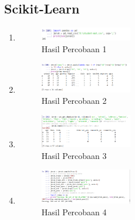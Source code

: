 	\subsection{Scikit-Learn}
	\begin{enumerate}
		\item \hfill \break 
		\begin{figure}[H]
			\includegraphics[width=4cm]{figures/1174043/chapter2/hasil1.png}
			\centering
			\caption{Hasil Percobaan 1}
		\end{figure}
		
		\item \hfill \break 
		\begin{figure}[H]
			\includegraphics[width=4cm]{figures/1174043/chapter2/hasil2.png}
			\centering
			\caption{Hasil Percobaan 2}
		\end{figure}
		
		\item \hfill \break 
		\begin{figure}[H]
			\includegraphics[width=4cm]{figures/1174043/chapter2/hasil3.png}
			\centering
			\caption{Hasil Percobaan 3}
		\end{figure}
		
		\item \hfill \break 
		\begin{figure}[H]
			\includegraphics[width=4cm]{figures/1174043/chapter2/hasil4.png}
			\centering
			\caption{Hasil Percobaan 4}
		\end{figure}
		

\end{enumerate}
